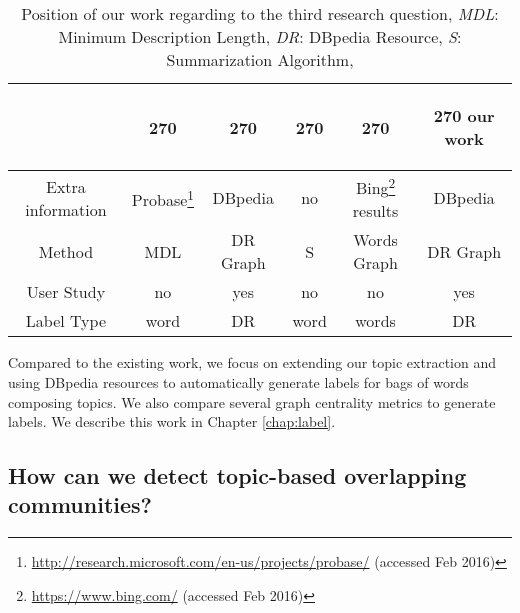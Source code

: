    \begin{table}[htp]
        \centering
        \begin{tabular}{c c c c c c}
        &
        \begin{turn}{270}
            \cite{chp6OnConceptualLabelingOfBagOfWords} 
        \end{turn} 
        &
        \begin{turn}{270} 
            \cite{chp2hulpus2013unsupervisedtopiclabeling} 
        \end{turn}
        &
        \begin{turn}{270} 
            \cite{chp2cano2014automatictopiclabeling}
        \end{turn}
        &
        \begin{turn}{270}
            \cite{chp2aletras2014labelling}
        \end{turn}
        &
        \begin{turn}{270}
        our work
        \end{turn}
        \\ \hline
        Extra information& Probase\footnote{\url{http://research.microsoft.com/en-us/projects/probase/} (accessed Feb 2016)} & DBpedia & no  & Bing\footnote{\url{https://www.bing.com/} (accessed Feb 2016)} results & DBpedia \\ \hline
        Method & MDL & DR Graph &S& Words Graph & DR Graph   \\ \hline
        User Study & no & yes & no & no&  yes \\ \hline
        Label Type & word & DR & word & words & DR \\ \hline
        
        \end{tabular}
        \caption{Position of our work regarding to the third research question, \textit{MDL}: Minimum Description Length, \textit{DR}: DBpedia Resource, \textit{S}: Summarization Algorithm,  }
    
        \label{tab:rq3compare}
    \end{table}
    
    Compared to the existing work, we focus on extending our topic extraction and using DBpedia resources to automatically generate labels for bags of words composing topics. We also compare several graph centrality metrics to generate labels. We describe this work in Chapter \ref{chap:label}.
    
    
\subsection{How can we detect topic-based overlapping communities?}



